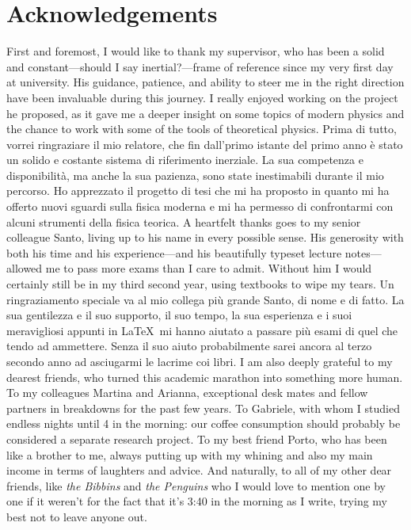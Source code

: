 \chapter{Acknowledgements}
\begin{paracol}{2}
    \small
    First and foremost, I would like to thank my supervisor, who has been a solid and constant---should I say iner\-tial?---frame of reference since my very first day at university. His guidance, patience, and ability to steer me in the right direction have been invaluable during this journey. I really enjoyed working on the project he proposed, as it gave me a deeper insight on some topics of modern physics and the chance to work with some of the tools of theoretical physics.
    \switchcolumn
    Prima di tutto, vorrei ringraziare il mio relatore, che fin dall'primo istante del primo anno è stato un solido e costante sistema di riferimento inerziale. La sua competenza e disponibilità, ma anche la sua pazienza, sono state inestimabili durante il mio percorso. Ho apprezzato il progetto di tesi che mi ha proposto in quanto mi ha offerto nuovi sguardi sulla fisica moderna e mi ha permesso di confrontarmi con alcuni strumenti della fisica teorica.
    \switchcolumn*
    A heartfelt thanks goes to my senior colleague Santo, living up to his name in every possible sense. His generosity with both his time and his experience---and his beautifully typeset lecture notes---allowed me to pass more exams than I care to admit. Without him I would certainly still be in my third second year, using textbooks to wipe my tears.
    \switchcolumn
    Un ringraziamento speciale va al mio collega più grande Santo, di nome e di fatto. La sua gentilezza e il suo supporto, il suo tempo, la sua esperienza e i suoi meravigliosi appunti in \LaTeX\ mi hanno aiutato a passare più esami di quel che tendo ad ammettere. Senza il suo aiuto probabilmente sarei ancora al terzo secondo anno ad asciugarmi le lacrime coi libri.
    \switchcolumn*
    I am also deeply grateful to my dearest friends, who turned this academic marathon into something more human. To my colleagues Martina and Arianna, exceptional desk mates and fellow partners in breakdowns for the past few years. To Gabriele, with whom I studied endless nights until 4 in the morning: our coffee consumption should probably be considered a separate research project. To my best friend Porto, who has been like a brother to me, always putting up with my whining and also my main income in terms of laughters and advice. And naturally, to all of my other dear friends, like \emph{the Bibbins} and \emph{the Penguins} who I would love to mention one by one if it weren't for the fact that it's 3:40 in the morning as I write, trying my best not to leave anyone out.

\end{paracol}
